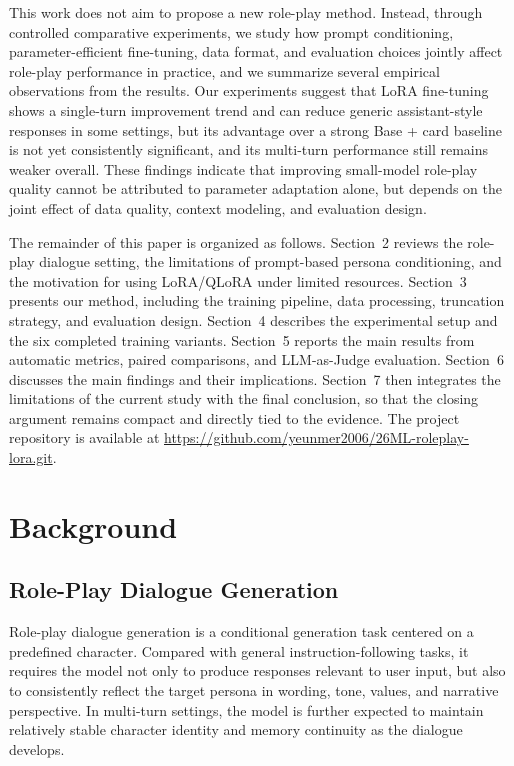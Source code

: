 \documentclass{article}
\newcommand{\card}{Base + card\xspace}
\begin{document}
This work does not aim to propose a new role-play method. Instead, through
controlled comparative experiments, we study how prompt conditioning,
parameter-efficient fine-tuning, data format, and evaluation choices jointly
affect role-play performance in practice, and we summarize several empirical
observations from the results. Our experiments suggest that LoRA fine-tuning
shows a single-turn improvement trend and can reduce generic assistant-style
responses in some settings, but its advantage over a strong \card baseline is
not yet consistently significant, and its multi-turn performance still remains
weaker overall. These findings indicate that improving small-model role-play
quality cannot be attributed to parameter adaptation alone, but depends on the
joint effect of data quality, context modeling, and evaluation design.

The remainder of this paper is organized as follows. Section~2 reviews the
role-play dialogue setting, the limitations of prompt-based persona
conditioning, and the motivation for using LoRA/QLoRA under limited resources.
Section~3 presents our method, including the training pipeline, data processing,
truncation strategy, and evaluation design. Section~4 describes the
experimental setup and the six completed training variants. Section~5 reports
the main results from automatic metrics, paired comparisons, and LLM-as-Judge
evaluation. Section~6 discusses the main findings and their implications.
Section~7 then integrates the limitations of the current study with the final
conclusion, so that the closing argument remains compact and directly tied to
the evidence. The project repository is available at
\url{https://github.com/yeunmer2006/26ML-roleplay-lora.git}.

\section{Background}

\subsection{Role-Play Dialogue Generation}

Role-play dialogue generation is a conditional generation task centered on a
predefined character. Compared with general instruction-following tasks, it
requires the model not only to produce responses relevant to user input, but
also to consistently reflect the target persona in wording, tone, values, and
narrative perspective. In multi-turn settings, the model is further expected to
maintain relatively stable character identity and memory continuity as the
dialogue develops.
\end{document}
